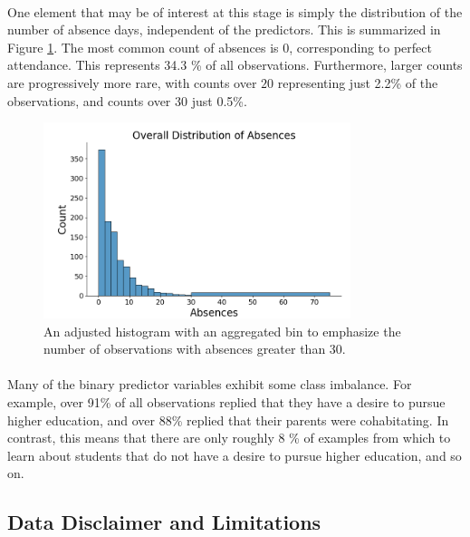 \documentclass[12pt, titlepage]{article}
\begin{document}
	\paragraph{} One element that may be of interest at this stage is simply the distribution of the number of absence days, independent of the predictors. This is summarized in Figure \ref{histogram}. The most common count of absences is $0$, corresponding to perfect attendance. This represents 34.3 \% of all observations. Furthermore, larger counts are progressively more rare, with counts over $20$ representing just 2.2\% of the observations, and counts over 30 just 0.5\%. 
	
	\begin{figure}[h!]
		\centering
		\includegraphics[width = 0.8\textwidth]{fig/Histogram.png}
		\caption{An adjusted histogram with an aggregated bin to emphasize the number of observations with absences greater than 30.}
		\label{histogram}
	\end{figure}
	
	\paragraph{} Many of the binary predictor variables exhibit some class imbalance. For example, over 91\% of all observations replied that they have a desire to pursue higher education, and over 88\% replied that their parents were cohabitating. In contrast, this means that there are only roughly 8 \% of examples from which to learn about students that do not have a desire to pursue higher education, and so on. 
	
	\subsection{Data Disclaimer and Limitations}
\end{document}

